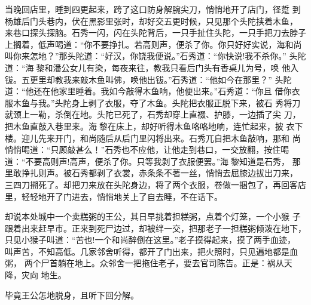 当晚回店里，睡到四更起来，跨了这口防身解腕尖刀，悄悄地开了店门，径踅
到杨雄后门头巷内，伏在黑影里张时，却好交五更时候，只见那个头陀挟着木鱼，
来巷口探头探脑。石秀一闪，闪在头陀背后，一只手扯住头陀，一只手把刀去脖子
上搁着，低声喝道：“你不要挣扎。若高则声，便杀了你。你只好好实说，海和尚
叫你来怎地？”那头陀道：“好汉，你饶我便说。”石秀道：“你快说!我不杀你。”
头陀道：“海黎和潘公女儿有染，每夜来往，教我只看后门头有香桌儿为号，唤
他入钹。五更里却教我来敲木鱼叫佛，唤他出钹。”石秀道：“他如今在那里？”
头陀道：“他还在他家里睡着。我如今敲得木鱼响，他便出来。”石秀道：“你且
借你衣服木鱼与我。”头陀身上剥了衣服，夺了木鱼。头陀把衣服正脱下来，被石
秀将刀就颈上一勒，杀倒在地。头陀已死了，石秀却穿上直裰、护膝，一边插了尖
刀，把木鱼直敲入巷里来。海黎在床上，却好听得木鱼咯咯地响，连忙起来，披
衣下楼。迎儿先来开门，和尚随后从后门里闪将出来。石秀兀自把木鱼敲响，那和
尚悄悄喝道：“只顾敲甚么！”石秀也不应他，让他走到巷口，一交放翻，按住喝
道：“不要高则声!高声，便杀了你。只等我剥了衣服便罢。”海黎知道是石秀，
那里敢挣扎则声。被石秀都剥了衣裳，赤条条不著一丝，悄悄去屈膝边拔出刀来，
三四刀搠死了。却把刀来放在头陀身边，将了两个衣服，卷做一捆包了，再回客店
里，轻轻地开了门进去，悄悄地关上了自去睡，不在话下。

却说本处城中一个卖糕粥的王公，其日早挑着担糕粥，点着个灯笼，一个小猴
子跟着出来赶早市。正来到死尸边过，却被绊一交，把那老子一担糕粥倾泼在地下，
只见小猴子叫道：“苦也!一个和尚醉倒在这里。”老子摸得起来，摸了两手血迹，
叫声苦，不知高低。几家邻舍听得，都开了门出来，把火照时，只见遍地都是血粥，
两个尸首躺在地上。众邻舍一把拖住老子，要去官司陈告。正是：祸从天降，灾向
地生。

毕竟王公怎地脱身，且听下回分解。